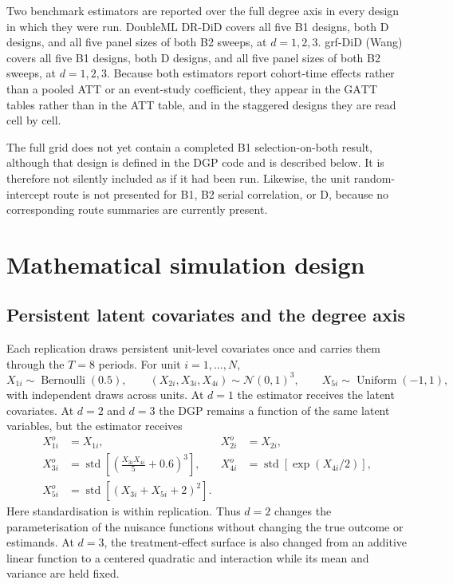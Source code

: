 \documentclass[11pt]{article}
\newcommand{\gatt}{\mathrm{GATT}}
\begin{document}
\begingroup
\setlength{\tabcolsep}{0.5pt}

\endgroup

Two benchmark estimators are reported over the full degree axis in every design
in which they were run. DoubleML DR-DiD covers all five B1 designs, both D
designs, and all five panel sizes of both B2 sweeps, at $d=1,2,3$. grf-DiD
(Wang) covers all five B1 designs, both D designs, and all five panel sizes of
both B2 sweeps, at $d=1,2,3$. Because
both estimators report cohort-time effects rather than a pooled ATT or an
event-study coefficient, they appear in the $\gatt$ tables rather than in the
ATT table, and in the staggered designs they are read cell by cell.

The full grid does not yet contain a completed B1 selection-on-both result,
although that design is defined in the DGP code and is described below. It is
therefore not silently included as if it had been run. Likewise, the unit
random-intercept route is not presented for B1, B2 serial correlation, or D,
because no corresponding route summaries are currently present.

\section{Mathematical simulation design}

\subsection{Persistent latent covariates and the degree axis}

Each replication draws persistent unit-level covariates once and carries them
through the $T=8$ periods. For unit $i=1,\ldots,N$,
\begin{equation}
 X_{1i}\sim\operatorname{Bernoulli}(0.5),\qquad
 (X_{2i},X_{3i},X_{4i})\sim\mathcal{N}(0,1)^3,\qquad
 X_{5i}\sim\operatorname{Uniform}(-1,1),
 \label{eq:covariates}
\end{equation}
with independent draws across units. At $d=1$ the estimator receives the
latent covariates. At $d=2$ and $d=3$ the DGP remains a function of the same
latent variables, but the estimator receives
\begin{align}
 X_{1i}^{o}&=X_{1i}, & X_{2i}^{o}&=X_{2i},\\
 X_{3i}^{o}&=\operatorname{std}\!\left[
       \left(\frac{X_{3i}X_{4i}}{5}+0.6\right)^3\right], &
 X_{4i}^{o}&=\operatorname{std}\!\left[\exp(X_{4i}/2)\right],\\
 X_{5i}^{o}&=\operatorname{std}\!\left[(X_{3i}+X_{5i}+2)^2\right].
 \label{eq:ks-transforms}
\end{align}
Here standardisation is within replication. Thus $d=2$ changes the
parameterisation of the nuisance functions without changing the true outcome
or estimands. At $d=3$, the treatment-effect surface is also changed from an
additive linear function to a centered quadratic and interaction while its
mean and variance are held fixed.
\end{document}
